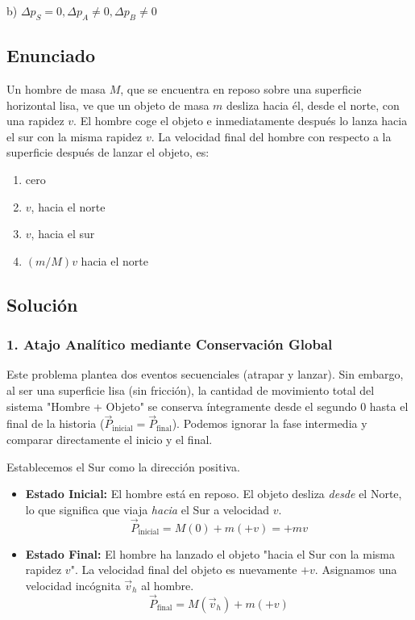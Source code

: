\documentclass[12pt, a4paper]{article}
\begin{document}
\begin{tcolorbox}[colback=green!5!white, colframe=green!50!black, title=Respuesta Final]
\centering \Large b) $\Delta p_S = 0, \Delta p_A \neq 0, \Delta p_B \neq 0$
\end{tcolorbox}

\newpage

\subsection*{Enunciado}
Un hombre de masa $M$, que se encuentra en reposo sobre una superficie horizontal lisa, ve que un objeto de masa $m$ desliza hacia él, desde el norte, con una rapidez $v$. El hombre coge el objeto e inmediatamente después lo lanza hacia el sur con la misma rapidez $v$. La velocidad final del hombre con respecto a la superficie después de lanzar el objeto, es:
\begin{enumerate}[label=\alph*)]
    \item cero
    \item $v$, hacia el norte
    \item $v$, hacia el sur
    \item $(m/M) v$ hacia el norte
\end{enumerate}

\subsection*{Solución}

\subsubsection*{1. Atajo Analítico mediante Conservación Global}
Este problema plantea dos eventos secuenciales (atrapar y lanzar). Sin embargo, al ser una superficie lisa (sin fricción), la cantidad de movimiento total del sistema "Hombre + Objeto" se conserva íntegramente desde el segundo 0 hasta el final de la historia ($\vec{P}_{\text{inicial}} = \vec{P}_{\text{final}}$). Podemos ignorar la fase intermedia y comparar directamente el inicio y el final.

Establecemos el Sur como la dirección positiva.
\begin{itemize}
    \item \textbf{Estado Inicial:} El hombre está en reposo. El objeto desliza \textit{desde} el Norte, lo que significa que viaja \textit{hacia} el Sur a velocidad $v$.
    $$ \vec{P}_{\text{inicial}} = M(0) + m(+v) = +mv $$
    \item \textbf{Estado Final:} El hombre ha lanzado el objeto "hacia el Sur con la misma rapidez $v$". La velocidad final del objeto es nuevamente $+v$. Asignamos una velocidad incógnita $\vec{v}_h$ al hombre.
    $$ \vec{P}_{\text{final}} = M(\vec{v}_h) + m(+v) $$
\end{itemize}
\end{document}
